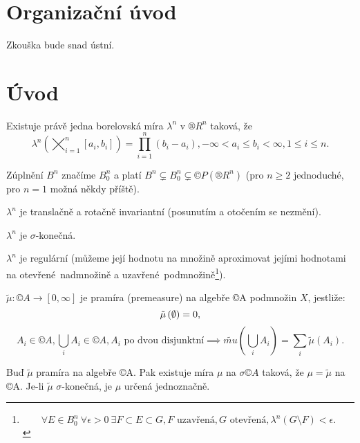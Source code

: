\documentclass[12pt]{article}					%
\begin{document}

\section*{Organizační úvod}
	\begin{poznamka}
		Zkouška bude snad ústní.
	\end{poznamka}

\section*{Úvod}
\begin{veta}
	Existuje právě jedna borelovská míra $\lambda^n$ v $®R^n$ taková, že
	$$ \lambda^n\left(\bigtimes_{i=1}^n[a_i, b_i]\right) = \prod_{i=1}^n \left(b_i - a_i\right), -∞ < a_i ≤ b_i < ∞, 1 ≤ i ≤ n. $$

	\begin{poznamkain}
		Zúplnění $B^n$ značíme $B_0^n$ a platí $B^n \subsetneq B_0^n \subsetneq ©P(®R^n)$ (pro $n ≥ 2$ jednoduché, pro $n = 1$ možná někdy příště).

		$\lambda^n$ je translačně a rotačně invariantní (posunutím a otočením se nezmění).

		$\lambda^n$ je $\sigma$-konečná.

		$\lambda^n$ je regulární (můžeme její hodnotu na množině aproximovat jejími hodnotami na otevřené nadmnožině a uzavřené podmnožině\footnote{$$ \forall E \in B_0^n\ \forall \epsilon > 0\ \exists F \subset E \subset G, F\text{ uzavřená}, G\text{ otevřená}, \lambda^n\left(G \setminus F \right) < \epsilon.  $$}).
	\end{poznamkain}
\end{veta}

\begin{definice}[Pramíra]
	$\tilde{\mu}: ©A \rightarrow [0, ∞]$ je pramíra (premeasure) na algebře ©A podmnožin $X$, jestliže:
	$$ \tilde{\mu}\left(\emptyset\right) = 0, $$
	$$ A_i \in ©A, \bigcup_i A_i \in ©A, A_i \text{ po dvou disjunktní} \implies \tilde{mu}\left(\bigcup_iA_i\right) = \sum_i \tilde{\mu}\left(A_i\right). $$
\end{definice}

\begin{veta}
	Buď $\tilde{\mu}$ pramíra na algebře ©A. Pak existuje míra $\mu$ na $\sigma ©A$ taková, že $\mu = \tilde{\mu}$ na ©A. Je-li $\tilde{\mu}$ $\sigma$-konečná, je $\mu$ určená jednoznačně.
\end{veta}
\end{document}
